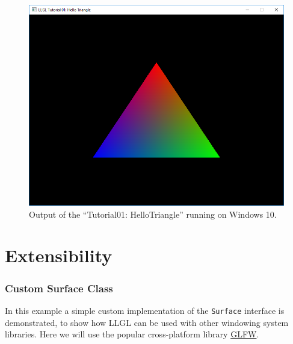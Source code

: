 \documentclass{article}
\begin{document}
\begin{figure}[H]
	\centering
	\includegraphics[width=0.9 \textwidth]{tut01_mask1a}
	\caption{Output of the ``Tutorial01: HelloTriangle'' running on Windows 10.}
	\label{fig:tut01_mask1}
\end{figure}



\newpage
\part{Extensibility}

\section{Custom Surface Class}
\label{sec:custom_surface}

In this example a simple custom implementation of the \texttt{Surface} interface is demonstrated,
to show how LLGL can be used with other windowing system libraries.
Here we will use the popular cross-platform library \href{http://www.glfw.org/}{GLFW}.
\end{document}
